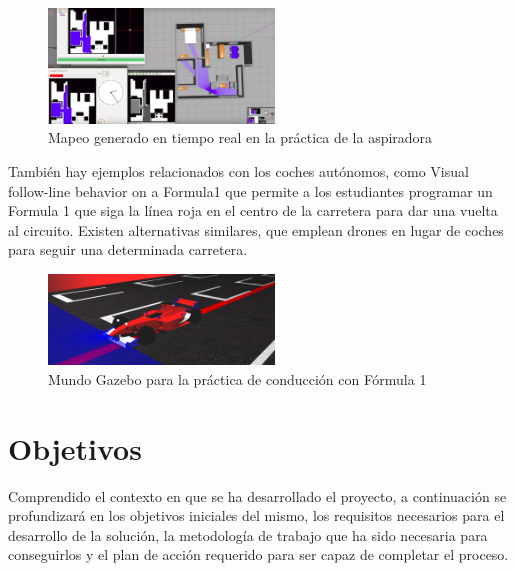 \documentclass[12pt,spanish,chapterprefix, numbers=noenddot]{book}
\numberwithin{equation}{section}
\numberwithin{figure}{section}
\begin{document}
\begin{figure}[hbt!]
\centering
\includegraphics[width=6cm]{Figs/vacuumcleaner.png}
\par
\caption{\label{fig:vacuum}Mapeo generado en tiempo real en la práctica de la aspiradora}
\end{figure}

También hay ejemplos relacionados con los coches autónomos, como Visual follow-line behavior on a Formula1 que permite a los estudiantes programar un Formula 1 que siga la línea roja en el centro de la carretera para dar una vuelta al circuito. Existen alternativas similares, que emplean drones en lugar de coches para seguir una determinada carretera\cite{Pablo}.

\begin{figure}[hbt!]
\centering
\includegraphics[width=6cm]{Figs/f1.png}
\par
\caption{\label{fig:f1}Mundo Gazebo para la práctica de conducción con Fórmula 1}
\end{figure}


\chapter{Objetivos}
Comprendido el contexto en que se ha desarrollado el proyecto, a continuación se
profundizará en los objetivos iniciales del mismo, los requisitos necesarios para el desarrollo de la solución, la metodología de trabajo que ha sido necesaria para conseguirlos y el plan de acción requerido para ser capaz de completar el proceso. 
\end{document}
